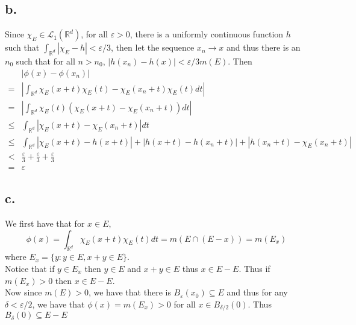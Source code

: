 \documentclass[11pt]{article}
\theoremstyle{mystyle}
\theoremstyle{definition}
\begin{document}
\subsection*{b.}
Since $\chi_E \in \mathcal{L}_1(\mathbb{R}^d)$, for all $\varepsilon > 0$, there is a uniformly continuous function $h$ such that $\int_{\mathbb{R}^d} |\chi_E - h| < \varepsilon / 3$, then let the sequence $x_n \to x$ and thus there is an $n_0$ such that for all $n > n_0$, $|h(x_n) - h(x)| < \varepsilon/3m(E)$. Then
\begin{align*}
  & |\phi(x) - \phi(x_n)| \\
  =& \left| \int_{\mathbb{R}^d} \chi_E(x+t) \chi_E(t) - \chi_E(x_n+t) \chi_E(t) dt \right|\\
  =& \left|\int_{\mathbb{R}^d} \chi_E(t)\left( \chi_E(x+t) - \chi_E(x_n+t)  \right) dt \right| \\
  \le & \int_{\mathbb{R}^d} |\chi_E(x+t) - \chi_E(x_n+t) | dt \\
  \le & \int_{\mathbb{R}^d} |\chi_E(x+t) - h(x+t)| + |h(x+t) - h(x_n+t)| + |h(x_n+t) - \chi_E (x_n+t) | \\
  < & \displaystyle\frac{\varepsilon}{3} + \displaystyle\frac{\varepsilon}{3} + \displaystyle\frac{\varepsilon}{3} \\
  = & \varepsilon
\end{align*}
\subsection*{c.}
We first have that for $x \in E$,  
\[
  \phi(x) = \int_{\mathbb{R}^d} \chi_E(x+t) \chi_E(t) dt = m(E \cap (E - x)) = m(E_x)
\]
where $E_x = \{y: y \in E, x+y \in E\}$. \\
Notice that if $y \in E_x$ then $y \in E$ and $x+y\in E$ thus $x \in E-E$. Thus if $m(E_x) > 0$ then $x \in E - E$. \\
Now since $m(E)> 0$, we have that there is $B_\varepsilon(x_0) \subseteq E$ and thus for any $ \delta < \varepsilon/2$, we have that $\phi(x) = m(E_x) > 0$ for all $x \in B_{\delta/2}(0)$. Thus $B_\delta(0) \subseteq E-E$
\newpage
\end{document}
